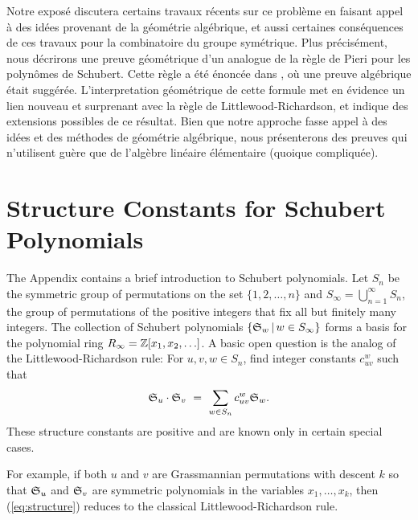 Notre expos\'e discutera certains travaux r\'ecents sur ce probl\`eme
en faisant appel \`a des id\'ees provenant de la g\'eom\'etrie
alg\'ebrique, et aussi certaines cons\'equences de ces travaux pour
la combinatoire du groupe sym\'etrique. Plus pr\'ecis\'ement, nous
d\'ecrirons une preuve g\'eom\'etrique d'un analogue de la r\`egle de
Pieri pour les polyn\^omes de Schubert. Cette r\`egle a \'et\'e
\'enonc\'ee dans \cite{Lascoux_Schutzenberger_polynomes_schubert},
o\`u une preuve alg\'ebrique \'etait sugg\'er\'ee. L'interpretation
g\'eom\'etrique de cette formule met en \'evidence un lien nouveau
et surprenant avec la r\`egle de Littlewood-Richardson, et indique
des extensions possibles de ce r\'esultat.
Bien que notre approche fasse appel \`a des id\'ees et des m\'ethodes de
g\'eom\'etrie alg\'ebrique, nous pr\'esenterons des preuves qui
n'utilisent gu\`ere que de l'alg\`ebre lin\'eaire \'el\'ementaire
(quoique compliqu\'ee).


\section{Structure Constants for Schubert Polynomials}


The Appendix contains a brief introduction to Schubert polynomials.
Let $S_n$ be the symmetric group of permutations on the set 
$\{1,2,\ldots,n\}$ and
$S_{\infty} = \bigcup_{n=1}^{\infty} S_n$, the group of 
permutations of the positive integers that fix all but finitely many 
integers.
The collection of Schubert polynomials 
$\{{\frak S}_{w}\,|\,w\in S_{\infty}\}$ forms a basis 
for the polynomial ring 
$R_\infty={\Bbb Z}[x_1,x_2,\ldots]$.
A basic open question is the analog of the Littlewood-Richardson rule:
For $u,v,w \in S_n$, find integer constants $c^{w}_{uv}$ 
such that
\begin{equation}
{\frak S}_{u}\cdot {\frak S}_{v}\  = \ 
\sum_{w\in S_n}c^{w}_{uv}{\frak S}_{w}.
\label{eq:structure}
\end{equation}
These structure constants are positive and 
are known only in certain special cases.

For example, if both $u$ and $v$ are Grassmannian permutations with 
descent $k$ so that ${\frak S}_{u}$ and ${\frak S}_{v}$ are 
symmetric polynomials in the variables $x_1,\ldots,x_k$, then
(\ref{eq:structure}) reduces to the classical Littlewood-Richardson rule.

